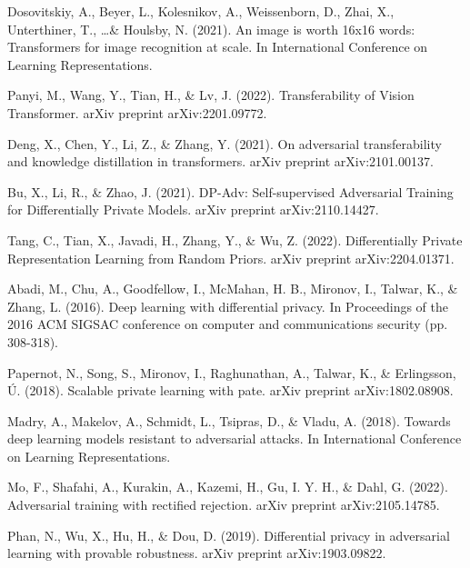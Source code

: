 \documentclass[11pt, conference]{IEEEtran}
\begin{document}

\begin{thebibliography}{10}

Dosovitskiy, A., Beyer, L., Kolesnikov, A., Weissenborn, D., Zhai, X., Unterthiner, T., \ldots \& Houlsby, N. (2021). An image is worth 16x16 words: Transformers for image recognition at scale. In International Conference on Learning Representations.

Panyi, M., Wang, Y., Tian, H., \& Lv, J. (2022). Transferability of Vision Transformer. arXiv preprint arXiv:2201.09772.

Deng, X., Chen, Y., Li, Z., \& Zhang, Y. (2021). On adversarial transferability and knowledge distillation in transformers. arXiv preprint arXiv:2101.00137.

Bu, X., Li, R., \& Zhao, J. (2021). DP-Adv: Self-supervised Adversarial Training for Differentially Private Models. arXiv preprint arXiv:2110.14427.

Tang, C., Tian, X., Javadi, H., Zhang, Y., \& Wu, Z. (2022). Differentially Private Representation Learning from Random Priors. arXiv preprint arXiv:2204.01371.

Abadi, M., Chu, A., Goodfellow, I., McMahan, H. B., Mironov, I., Talwar, K., \& Zhang, L. (2016). Deep learning with differential privacy. In Proceedings of the 2016 ACM SIGSAC conference on computer and communications security (pp. 308-318).

Papernot, N., Song, S., Mironov, I., Raghunathan, A., Talwar, K., \& Erlingsson, Ú. (2018). Scalable private learning with pate. arXiv preprint arXiv:1802.08908.

Madry, A., Makelov, A., Schmidt, L., Tsipras, D., \& Vladu, A. (2018). Towards deep learning models resistant to adversarial attacks. In International Conference on Learning Representations.

Mo, F., Shafahi, A., Kurakin, A., Kazemi, H., Gu, I. Y. H., \& Dahl, G. (2022). Adversarial training with rectified rejection. arXiv preprint arXiv:2105.14785.

Phan, N., Wu, X., Hu, H., \& Dou, D. (2019). Differential privacy in adversarial learning with provable robustness. arXiv preprint arXiv:1903.09822.

\end{thebibliography}

\balance
\end{document}
